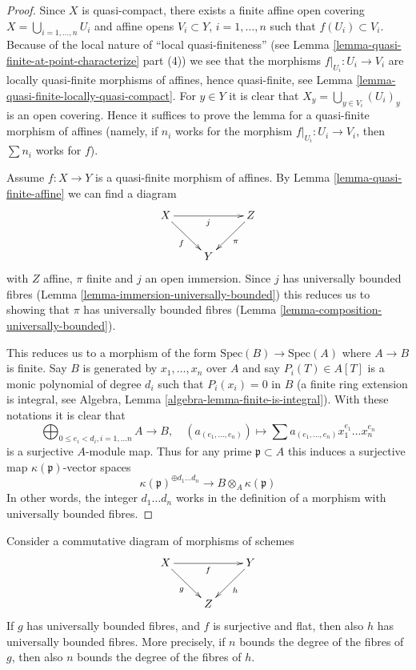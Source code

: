 \begin{proof}
Since $X$ is quasi-compact, there exists a finite affine open covering
$X = \bigcup_{i = 1, \ldots, n} U_i$ and affine opens $V_i \subset Y$,
$i = 1, \ldots, n$ such that $f(U_i) \subset V_i$.
Because of the local nature of ``local quasi-finiteness''
(see Lemma \ref{lemma-quasi-finite-at-point-characterize} part (4))
we see that the morphisms $f|_{U_i} : U_i \to V_i$ are locally
quasi-finite morphisms of affines, hence quasi-finite, see
Lemma \ref{lemma-quasi-finite-locally-quasi-compact}.
For $y \in Y$ it is clear that $X_y = \bigcup_{y \in V_i} (U_i)_y$
is an open covering. Hence it suffices to prove the lemma
for a quasi-finite morphism of affines (namely, if $n_i$ works
for the morphism $f|_{U_i} : U_i \to V_i$, then $\sum n_i$
works for $f$).

\medskip\noindent
Assume $f : X \to Y$ is a quasi-finite morphism of affines.
By Lemma \ref{lemma-quasi-finite-affine}
we can find a diagram
$$
\xymatrix{
X \ar[rd]_f \ar[rr]_{j} & & Z \ar[ld]^\pi \\
& Y &
}
$$
with $Z$ affine, $\pi$ finite and $j$ an open immersion. Since
$j$ has universally bounded fibres
(Lemma \ref{lemma-immersion-universally-bounded})
this reduces us to showing that $\pi$ has universally bounded
fibres (Lemma \ref{lemma-composition-universally-bounded}).

\medskip\noindent
This reduces us to a morphism of the form
$\text{Spec}(B) \to \text{Spec}(A)$ where 
$A \to B$ is finite. Say $B$ is generated by $x_1, \ldots, x_n$
over $A$ and say $P_i(T) \in A[T]$ is a monic polynomial of degree
$d_i$ such that $P_i(x_i) = 0$ in $B$ (a finite ring extension
is integral, see
Algebra, Lemma \ref{algebra-lemma-finite-is-integral}).
With these notations it is clear that
$$
\bigoplus_{0 \leq e_i < d_i, i = 1, \ldots n} A
\longrightarrow
B, \quad
(a_{(e_1, \ldots, e_n)}) \longmapsto
\sum a_{(e_1, \ldots, e_n)} x_1^{e_1} \ldots x_n^{e_n}
$$
is a surjective $A$-module map. Thus for any prime $\mathfrak p \subset A$
this induces a surjective map $\kappa(\mathfrak p)$-vector spaces
$$
\kappa(\mathfrak p)^{\oplus d_1 \ldots d_n} \longrightarrow
B \otimes_A \kappa(\mathfrak p)
$$
In other words, the integer $d_1 \ldots d_n$ works in the definition
of a morphism with universally bounded fibres.
\end{proof}

\begin{lemma}
\label{lemma-universally-bounded-permanence}
Consider a commutative diagram of morphisms of schemes
$$
\xymatrix{
X \ar[rd]_g \ar[rr]_{f} & & Y \ar[ld]^h \\
& Z &
}
$$
If $g$ has universally bounded fibres, and $f$ is surjective and flat,
then also $h$ has universally bounded fibres. More precisely, if $n$
bounds the degree of the fibres of $g$, then also $n$ bounds the
degree of the fibres of $h$.
\end{lemma}

